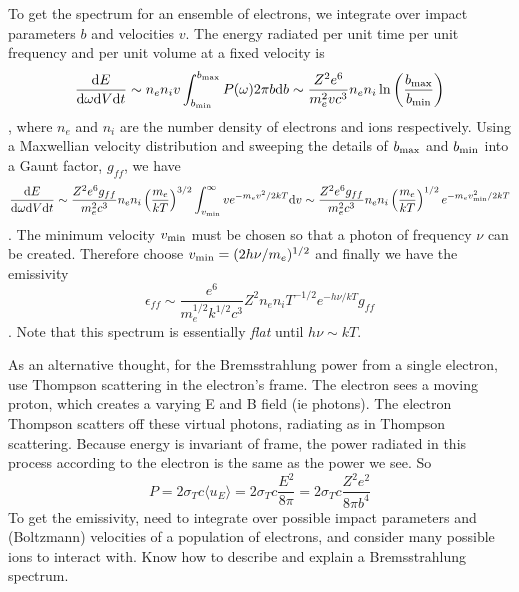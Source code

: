 To get the spectrum for an ensemble of electrons, we integrate over impact parameters $b$ and
velocities $v$.  The energy radiated per unit time per unit frequency and per unit volume
at a fixed velocity is
\begin{dmath*}
    \frac{\d E}{\d\omega\d V\d t}
        \sim n_en_iv\int_{b_{\rm min}}^{b_{\rm max}} P(\omega) 2\pi b\d b \nolinebreak
        \sim \frac{Z^2e^6}{m_e^2vc^3}n_en_i\ln\left(\frac{b_{\rm max}}{b_{\rm min}}\right)
\end{dmath*},
where $n_e$ and $n_i$ are the number density of electrons and ions respectively.
Using a Maxwellian velocity distribution and sweeping the details of $b_{\rm max}$ and
$b_{\rm min}$ into a Gaunt factor, $g_{ff}$, we have
\begin{dmath*}
    \frac{\d E}{\d\omega\d V\d t}
        \sim \frac{Z^2e^6g_{ff}}{m_e^2c^3}n_en_i\left(\frac{m_e}{kT}\right)^{3/2}\int_{v_{\rm min}}^\infty ve^{-m_ev^2/2kT} \d v
        \sim \frac{Z^2e^6g_{ff}}{m_e^2c^3}n_en_i\left(\frac{m_e}{kT}\right)^{1/2}e^{-m_ev_{\rm min}^2/2kT}
\end{dmath*}.
The minimum velocity $v_{\rm min}$ must be chosen so that a photon of frequency $\nu$ can
be created.  Therefore choose $v_{\rm min}=(2h\nu/m_e)^{1/2}$ and finally we have the emissivity
\begin{dmath}\boxed{
    \epsilon_{ff}
        \sim \frac{e^6}{m_e^{1/2}k^{1/2}c^3}Z^2n_en_iT^{-1/2}e^{-h\nu/kT}g_{ff}
}\end{dmath}.
Note that this spectrum is essentially \emph{flat} until $h\nu\sim kT$.

As an alternative thought,
for the Bremsstrahlung power from a single electron, use Thompson scattering in the electron's 
frame.  The electron sees a moving proton, which creates a varying E and B field (ie photons).  
The electron Thompson scatters off these virtual photons, radiating as in Thompson scattering.
Because energy is invariant of frame, the power radiated in this process according to the 
electron is the same as the power we see.  So
\begin{displaymath}P=2\sigma_Tc\langle u_E \rangle=2\sigma_Tc\frac{E^2}{8\pi}=2\sigma_Tc\frac{Z^2e^2}{8\pi b^4}\end{displaymath}
To get the emissivity, need to integrate over possible impact parameters and (Boltzmann) 
velocities of a population of electrons, and consider many possible ions to interact with.  
Know how to describe and explain a Bremsstrahlung spectrum.

